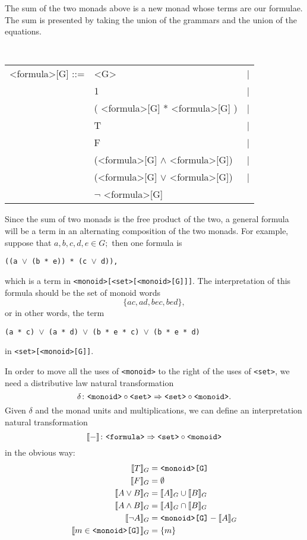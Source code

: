 \documentclass{article}
\newcommand{\interp}[1]{\llbracket #1 \rrbracket}
\newcommand{\maps}{\colon}
\newcommand{\gram}[1]{\mbox{\tt <#1>}}
\begin{document}
The sum of the two monads above is a new monad whose terms are our formulae.  The sum is presented by taking the union of the grammars and the union of the equations.
\begin{center}
  \tt
  \begin{tabular}{rll}
    <formula>[G] ::= & <G> &| \\
    & 1 &| \\
    & ( <formula>[G] * <formula>[G] ) &|\\
    & T &|\\
    & F &| \\
    & (<formula>[G] $\land$ <formula>[G]) &| \\
    & (<formula>[G] $\lor$ <formula>[G]) &| \\
    & $\neg$ <formula>[G]
  \end{tabular}
\end{center}
Since the sum of two monads is the free product of the two, a general formula will be a term in an alternating composition of the two monads.  For example, suppose that $a, b, c, d, e \in G;$ then one formula is
\begin{center}
  \tt ((a $\lor$ (b * e)) * (c $\lor$ d)),
\end{center}
which is a term in {\tt <monoid>[<set>[<monoid>[G]]]}.  The interpretation of this formula should be the set of monoid words
\[ \{ ac, ad, bec, bed \}, \]
or in other words, the term
\begin{center}
  \tt (a * c) $\lor$ (a * d) $\lor$ (b * e * c) $\lor$ (b * e * d)
\end{center}
in {\tt <set>[<monoid>[G]]}.  

In order to move all the uses of {\tt <monoid>} to the right of the uses of {\tt <set>}, we need a distributive law natural transformation
\[ \delta\maps \gram{monoid}\circ\gram{set} \Rightarrow \gram{set}\circ\gram{monoid}. \]
Given $\delta$ and the monad units and multiplications, we can define an interpretation natural transformation
\[ \interp{-}\maps \gram{formula}\Rightarrow\gram{set}\circ\gram{monoid} \]
in the obvious way:
\begin{align*}
  \interp{T}_G &= \mbox{\tt <monoid>[G]}\\
  \interp{F}_G &= \emptyset\\
  \interp{{A}\lor{B}}_G &= \interp{A}_G \cup \interp{B}_G\\
  \interp{{A}\land{B}}_G &= \interp{A}_G \cap \interp{B}_G\\
  \interp{\neg A}_G &= \mbox{\tt <monoid>[G]} - \interp{A}_G\\
  \interp{m \in \mbox{\tt <monoid>[G]}}_G &= \{m\}
\end{align*}
\end{document}
